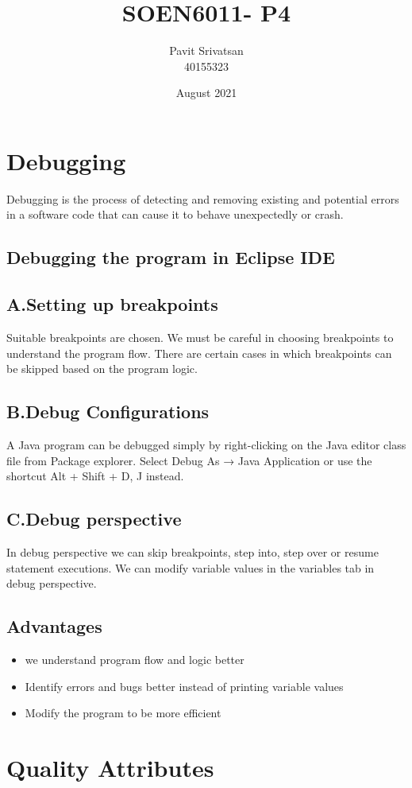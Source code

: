 \documentclass{article}
\title{SOEN6011- P4}
\author{Pavit Srivatsan\\ 40155323}
\date{August 2021}
\begin{document}
\maketitle

\section{Debugging}
Debugging is the process of detecting and removing existing and potential errors in a software code that can cause it to behave unexpectedly or crash.
\subsection{Debugging the program in Eclipse IDE}
\subsection*{A.Setting up breakpoints}
Suitable breakpoints are chosen. We must be careful in choosing
breakpoints to understand the program flow. There are certain cases in which breakpoints can be skipped based on the program logic.
\subsection*{B.Debug Configurations}
A Java program can be debugged simply by right-clicking on the Java editor class file from Package explorer. Select Debug As → Java Application or use the shortcut Alt + Shift + D, J instead. 
\subsection*{C.Debug perspective}
In debug perspective we can skip breakpoints, step into, step over or resume statement executions. We can modify variable values in the variables tab in debug perspective.
\subsection{Advantages}
\begin{itemize}
    \item we understand program flow and logic better
    \item Identify errors and bugs better instead of printing variable values
    \item Modify the program to be more efficient
\end{itemize}
\section{Quality Attributes}
\end{document}
